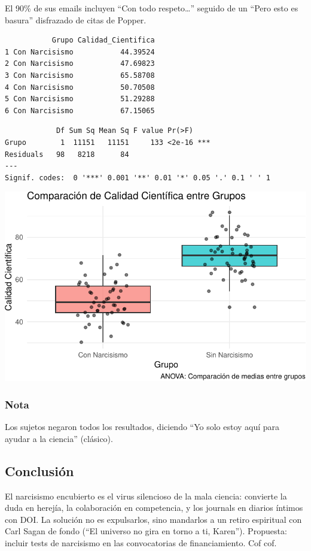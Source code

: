 \documentclass[
]{article}
\begin{document}
El 90\% de sus emails incluyen ``Con todo respeto\ldots{}'' seguido de
un ``Pero esto es basura'' disfrazado de citas de Popper.

\begin{verbatim}
           Grupo Calidad_Cientifica
1 Con Narcisismo           44.39524
2 Con Narcisismo           47.69823
3 Con Narcisismo           65.58708
4 Con Narcisismo           50.70508
5 Con Narcisismo           51.29288
6 Con Narcisismo           67.15065
\end{verbatim}

\begin{verbatim}
            Df Sum Sq Mean Sq F value Pr(>F)    
Grupo        1  11151   11151     133 <2e-16 ***
Residuals   98   8218      84                   
---
Signif. codes:  0 '***' 0.001 '**' 0.01 '*' 0.05 '.' 0.1 ' ' 1
\end{verbatim}

\includegraphics{template_files/figure-pdf/unnamed-chunk-3-1.pdf}

\subsubsection{Nota}\label{nota}

Los sujetos negaron todos los resultados, diciendo ``Yo solo estoy aquí
para ayudar a la ciencia'' (clásico).

\subsection{Conclusión}\label{conclusiuxf3n}

El narcisismo encubierto es el virus silencioso de la mala ciencia:
convierte la duda en herejía, la colaboración en competencia, y los
journals en diarios íntimos con DOI. La solución no es expulsarlos, sino
mandarlos a un retiro espiritual con Carl Sagan de fondo (``El universo
no gira en torno a ti, Karen''). Propuesta: incluir tests de narcisismo
en las convocatorias de financiamiento. Cof cof.
\end{document}
